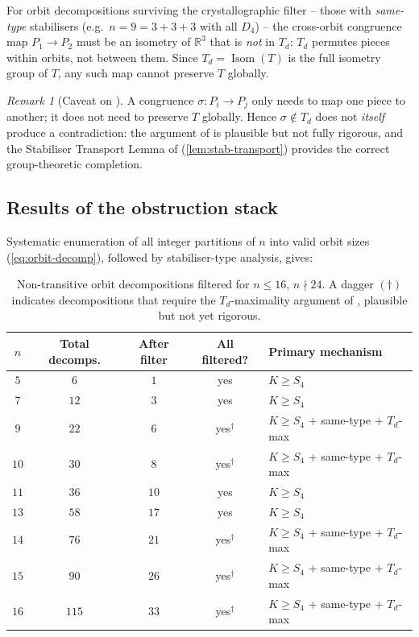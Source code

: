 \documentclass[11pt,a4paper]{article}
\theoremstyle{plain}
\theoremstyle{definition}
\theoremstyle{remark}
\newtheorem{remark}[remark]{Remark}
\DeclareMathOperator{\Isom}{Isom}
\newcommand{\Td}{T_{\!d}}
\newcommand{\R}{\mathbb{R}}
\begin{document}
\medskip

For orbit decompositions surviving the crystallographic filter -- those with
\emph{same-type} stabilisers (e.g.\ $n = 9 = 3 + 3 + 3$ with all $D_{4}$) --
the cross-orbit congruence map $P_{1} \to P_{2}$ must be an isometry of
$\R^{3}$ that is \emph{not} in $\Td$: $\Td$ permutes pieces within orbits,
not between them.  Since $\Td = \Isom(T)$ is the full isometry group of $T$,
any such map cannot preserve $T$ globally.

\begin{remark}[Caveat on ]\label{rem:td-max-caveat}
A congruence $\sigma \colon P_{i} \to P_{j}$ only needs to map one piece to
another; it does not need to preserve $T$ globally.  Hence
$\sigma \notin \Td$ does not \emph{itself} produce a contradiction: the
argument of  is plausible but not fully rigorous, and the
Stabiliser Transport Lemma of  (\cref{lem:stab-transport})
provides the correct group-theoretic completion.
\end{remark}

\subsection{Results of the obstruction stack}

Systematic enumeration of all integer partitions of $n$ into valid orbit
sizes (\eqref{eq:orbit-decomp}), followed by stabiliser-type analysis, gives:

\begin{table}[H]
\centering\small
\caption{Non-transitive orbit decompositions filtered for $n \leq 16$,
$n \nmid 24$.  A dagger $(\dagger)$ indicates decompositions that require
the $\Td$-maximality argument of , plausible but not yet
rigorous.}
\label{tab:orbit-filter}
\begin{tabular}{@{} c c c c l @{}}
\toprule
$n$ & Total decomps. & After filter & All filtered? & Primary mechanism \\
\midrule
$5$   & $6$   & $1$  & yes             & $K \geq S_{4}$ \\
$7$   & $12$  & $3$  & yes             & $K \geq S_{4}$ \\
$9$   & $22$  & $6$  & yes$^{\dagger}$ & $K \geq S_{4}$ + same-type + $\Td$-max \\
$10$  & $30$  & $8$  & yes$^{\dagger}$ & $K \geq S_{4}$ + same-type + $\Td$-max \\
$11$  & $36$  & $10$ & yes             & $K \geq S_{4}$ \\
$13$  & $58$  & $17$ & yes             & $K \geq S_{4}$ \\
$14$  & $76$  & $21$ & yes$^{\dagger}$ & $K \geq S_{4}$ + same-type + $\Td$-max \\
$15$  & $90$  & $26$ & yes$^{\dagger}$ & $K \geq S_{4}$ + same-type + $\Td$-max \\
$16$  & $115$ & $33$ & yes$^{\dagger}$ & $K \geq S_{4}$ + same-type + $\Td$-max \\
\bottomrule
\end{tabular}
\end{table}
\end{document}
